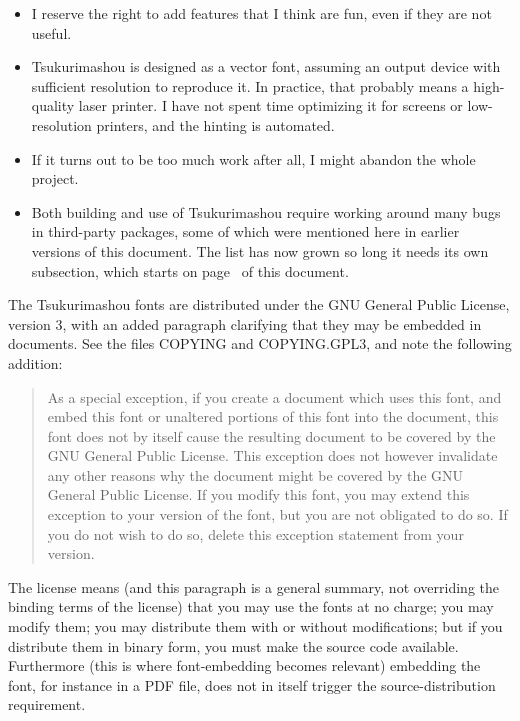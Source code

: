 \documentclass[14pt]{extarticle}
\begin{document}
\begin{itemize}
  \item I reserve the right to add features that I think are fun, even if
  they are not useful.

  \item Tsukurimashou is designed as a vector font, assuming an output
  device with sufficient resolution to reproduce it.  In practice, that
  probably means a high-quality laser printer.  I have not spent time
  optimizing it for screens or low-resolution printers, and the hinting is
  automated.

  \item If it turns out to be too much work after all, I might abandon the
  whole project.

  \item Both building and use of Tsukurimashou require working around many
  bugs in third-party packages, some of which were mentioned here in earlier
  versions of this document.  The list has now grown so long it needs its
  own subsection, which starts on page~\pageref{sub:bugs} of this document.
\end{itemize}

The Tsukurimashou fonts are distributed under the GNU General Public
License, version 3, with an added paragraph clarifying that they may be
embedded in documents.  See the files COPYING and COPYING.GPL3, and
note the following addition:

\begin{quotation}
As a special exception, if you create a document which uses this font, and
embed this font or unaltered portions of this font into the document, this
font does not by itself cause the resulting document to be covered by the
GNU General Public License. This exception does not however invalidate any
other reasons why the document might be covered by the GNU General Public
License. If you modify this font, you may extend this exception to your
version of the font, but you are not obligated to do so. If you do not wish
to do so, delete this exception statement from your version.
\end{quotation}

The license means (and this paragraph is a general summary, not overriding
the binding terms of the license) that you may use the fonts at no charge;
you may modify them; you may distribute them with or without modifications;
but if you distribute them in binary form, you must make the source code
available.  Furthermore (this is where font-embedding becomes relevant)
embedding the font, for instance in a PDF file, does not in itself
trigger the source-distribution requirement.
\end{document}
